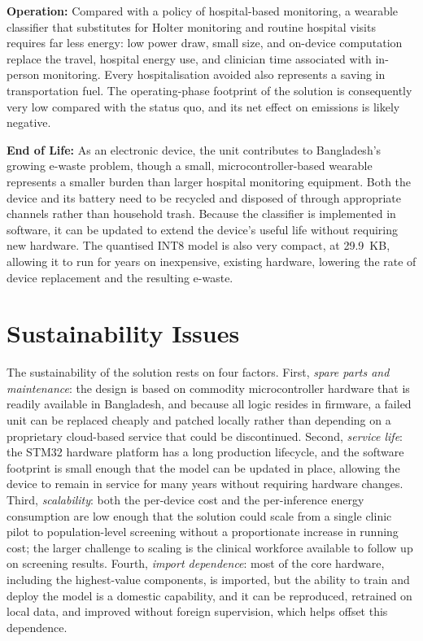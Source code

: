 \textbf{Operation:} Compared with a policy of hospital-based monitoring,
a wearable classifier that substitutes for Holter monitoring and routine
hospital visits requires far less energy: low power draw, small size, and
on-device computation replace the travel, hospital energy use, and
clinician time associated with in-person monitoring. Every hospitalisation
avoided also represents a saving in transportation fuel. The operating-phase
footprint of the solution is consequently very low compared with the
status quo, and its net effect on emissions is likely negative.

\textbf{End of Life:} As an electronic device, the unit contributes to
Bangladesh's growing e-waste problem, though a small, microcontroller-based
wearable represents a smaller burden than larger hospital monitoring
equipment. Both the device and its battery need to be recycled and
disposed of through appropriate channels rather than household trash.
Because the classifier is implemented in software, it can be updated to
extend the device's useful life without requiring new hardware. The
quantised INT8 model is also very compact, at 29.9~KB, allowing it to run
for years on inexpensive, existing hardware, lowering the rate of
device replacement and the resulting e-waste.

\section{Sustainability Issues}
\label{sec:sustainability}

The sustainability of the solution rests on four factors. First,
\emph{spare parts and maintenance}: the design is based on commodity
microcontroller hardware that is readily available in Bangladesh, and
because all logic resides in firmware, a failed unit can be replaced
cheaply and patched locally rather than depending on a proprietary
cloud-based service that could be discontinued. Second, \emph{service
life}: the STM32 hardware platform has a long production lifecycle, and
the software footprint is small enough that the model can be updated
in place, allowing the device to remain in service for many years without
requiring hardware changes. Third, \emph{scalability}: both the per-device
cost and the per-inference energy consumption are low enough that the
solution could scale from a single clinic pilot to population-level
screening without a proportionate increase in running cost; the larger
challenge to scaling is the clinical workforce available to follow up on
screening results. Fourth, \emph{import dependence}: most of the core
hardware, including the highest-value components, is imported, but the
ability to train and deploy the model is a domestic capability, and it can
be reproduced, retrained on local data, and improved without foreign
supervision, which helps offset this dependence.

